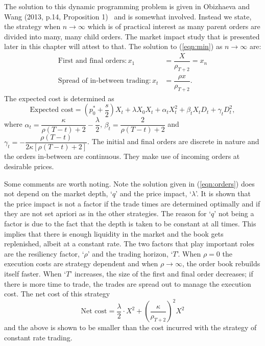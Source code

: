 The solution to this dynamic programming problem is given in Obizhaeva and Wang (2013, p.14, Proposition 1)~\cite{obizhaeva} and is somewhat involved. Instead we state, the strategy when $n\to\infty$ which is of practical interest as many parent orders are divided into many, many child orders. The market impact study that is presented later in this chapter will attest to that. The solution to (\ref{eqn:min}) as $n\to \infty$ are:
	\begin{equation}\label{eqn:orders}
	\begin{split}
	\text{First and final orders}: x_1&= \dfrac{X}{\rho_{T+2}} = x_n  \\
	\text{Spread of in-between trading}: x_t&= \dfrac{\rho x}{\rho_{T+2}}.
	\end{split}
	\end{equation}
The expected cost is determined as
	\begin{equation}\label{eqn:expected}
	\text{Expected cost}=\left(p_0^*+\dfrac{s}{2}\right)X_t+\lambda X_0X_t+\alpha_t X_t^2+\beta_t X_t D_t+\gamma_t D_t^2,
	\end{equation}
where $\alpha_t=\dfrac{\kappa}{\rho(T-t)+2} - \dfrac{\lambda}{2}$, $\beta_t=\dfrac{2}{\rho(T-t)+2}$ and $\gamma_t= - \dfrac{\rho(T-t)}{2\kappa[\rho(T-t)+2]}$. The initial and final orders are discrete in nature and the orders in-between are continuous. They make use of incoming orders at desirable prices. 


Some comments are worth noting. Note the solution given in (\ref{eqn:orders}) does not depend on the market depth, `$q$' and the price impact, `$\lambda$'. It is shown that the price impact is not a factor if the trade times are determined optimally and if they are not set apriori as in the other strategies. The reason for `$q$' not being a factor is due to the fact that the depth is taken to be constant at all times. This implies that there is enough liquidity in the market and the book gets replenished, albeit at a constant rate. The two factors that play important roles are the resiliency factor, `$\rho$' and the trading horizon, `$T$'. When $\rho=0$ the execution costs are strategy dependent and when $\rho\to\infty$, the order book rebuilds itself faster. When `$T$' increases, the size of the first and final order decreases; if there is more time to trade, the trades are spread out to manage the execution cost. The net cost of this strategy
	\begin{equation}\label{eqn:netcost}
	\text{Net cost}=\dfrac{\lambda}{2} \cdot X^2 + \left(\dfrac{\kappa}{\rho_{T+2}}\right)^2 X^2
	\end{equation}
and the above is shown to be smaller than the cost incurred with the strategy of constant rate trading. 


